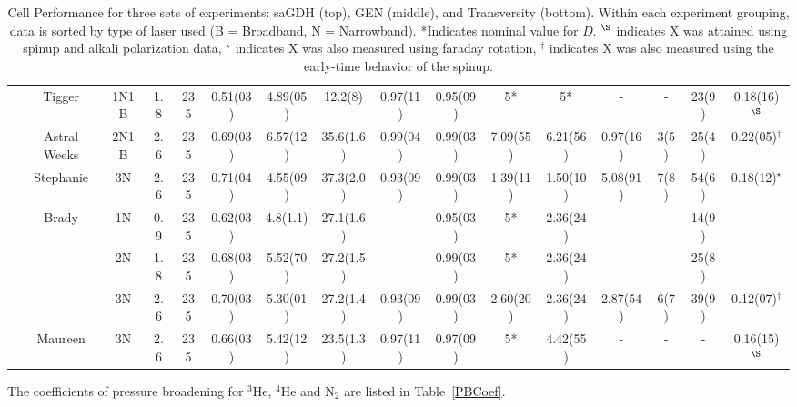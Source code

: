 \documentclass[pdftex,letterpaper,12pt]{report}
\begin{document}
\begin{table}
\begin{center}
\begin{tabular}{|c|c|ccc|ccc|ccccc|cc|c|}
			& Tigger & 1N1B & 1.8 & 235 & 0.51(03) & 4.89(05) & 12.2(8) & 0.97(11) & 0.95(09) & 5* & 5* & - & - & 23(9) & 0.18(16)$^\S$\\
			\cline{2-16}
			& Astral Weeks & 2N1B & 2.6 & 235 & 0.69(03) & 6.57(12) & 35.6(1.6) & 0.99(04) & 0.99(03) & 7.09(55) & 6.21(56) & 0.97(16) & 3(5) & 25(4) & 0.22(05)$^\dagger$\\
			\cline{2-16}
			& Stephanie & 3N & 2.6 & 235 & 0.71(04) & 4.55(09) & 37.3(2.0) & 0.93(09) & 0.99(03) & 1.39(11) & 1.50(10) & 5.08(91) & 7(8) & 54(6) & 0.18(12)$^\star$\\
			\cline{2-16}
			& \multirow{3}{*}{Brady} & 1N & 0.9 & 235 & 0.62(03) & 4.8(1.1) & 27.1(1.6) & - & 0.95(03) & 5* & 2.36(24) & -  & - & 14(9) & -\\
			& & 2N & 1.8 & 235 & 0.68(03) & 5.52(70) & 27.2(1.5) & - & 0.99(03) & 5* & 2.36(24) & - & - & 25(8) & -\\
			& & 3N & 2.6 & 235 & 0.70(03) & 5.30(01) & 27.2(1.4) & 0.93(09) & 0.99(03) & 2.60(20) & 2.36(24) & 2.87(54) & 6(7) & 39(9) & 0.12(07)$^\dagger$\\
			\cline{2-16}
			& Maureen & 3N & 2.6 & 235 & 0.66(03) & 5.42(12) & 23.5(1.3) & 0.97(11) & 0.97(09) & 5* & 4.42(55) & - & - & - & 0.16(15)$^\S$\\
			\hline
		\end{tabular}
	\end{center}
	\caption{Cell Performance for three sets of experiments: saGDH (top), GEN (middle), and Transversity (bottom).  Within each experiment grouping, data is sorted by type of laser used (B = Broadband, N = Narrowband).  *Indicates nominal value for $D$.  $^\S$ indicates X was attained using spinup and alkali polarization data, $^\star$ indicates X was also measured using faraday rotation, $^\dagger$ indicates X was also measured using the early-time behavior of the spinup.}
	\label{table:CellTable}
\end{table}

The coefficients of pressure broadening for $^{3}$He, $^{4}$He and N$_{2}$ are listed in Table~\ref{PBCoef}.
\end{document}
